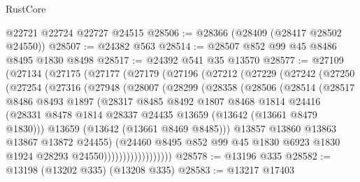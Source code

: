 \begin{lexlean}{RustCore}
\begin{coremodule}
    @22721
    @22724
    @22727
    @24515
@28506 := @28366 (@28409 (@28417 @28502 @24550))
@28507 := @24382 @563
@28514 := @28507 @852 @99 @45 @8486 @8495 @1830 @8498
@28517 := @24392 @541 @35 @13570
@28577 := @27109
    (@27134
      (@27175
        (@27177
          (@27179
            (@27196
              (@27212
                (@27229
                  (@27242
                    (@27250
                      (@27254
                        (@27316
                          (@27948
                            (@28007
                              (@28299
                                (@28358
                                  (@28506
                                    (@28514
                                      (@28517
                                        @8486
                                        @8493
                                        @1897
                                        (@28317
                                          @8485
                                          @8492
                                          @1807
                                          @8468
                                          @1814
                                          @24416
                                          (@28331
                                            @8478
                                            @1814
                                            @28337
                                            @24435
                                            @13659
                                            (@13642 (@13661 @8479 @1830)))
                                          @13659
                                          (@13642 (@13661 @8469 @8485)))
                                        @13857
                                        @13860
                                        @13863
                                        @13867
                                        @13872
                                        @24455)
                                      (@24460
                                        @8495
                                        @852
                                        @99
                                        @45
                                        @1830
                                        @6923
                                        @1830
                                        @1924
                                        @28293
                                        @24550))))))))))))))))))
@28578 := @13196 @335
@28582 := @13198 (@13202 @335) (@13208 @335)
@28583 := @13217 @17403

\end{coremodule}
\end{lexlean}

